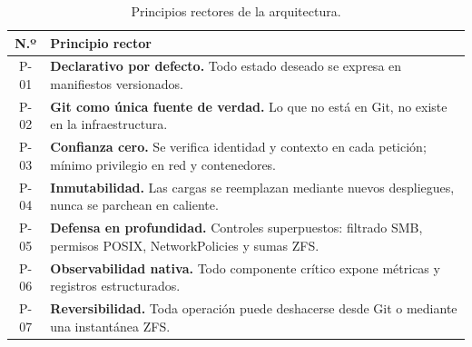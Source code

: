 \documentclass[10pt,a4paper]{article}
\begin{document}
\begin{table}[htbp]
\centering
\small
\caption{Principios rectores de la arquitectura.}
\label{tab:principios}
\begin{tabular}{|c|p{14.5cm}|}
\hline
\textbf{\textsf{N.º}} & \textbf{\textsf{Principio rector}} \\
\hline
P-01 & \textbf{Declarativo por defecto.} Todo estado deseado se expresa en manifiestos versionados. \\
\hline
P-02 & \textbf{Git como única fuente de verdad.} Lo que no está en Git, no existe en la infraestructura. \\
\hline
P-03 & \textbf{Confianza cero.} Se verifica identidad y contexto en cada petición; mínimo privilegio en red y contenedores. \\
\hline
P-04 & \textbf{Inmutabilidad.} Las cargas se reemplazan mediante nuevos despliegues, nunca se parchean en caliente. \\
\hline
P-05 & \textbf{Defensa en profundidad.} Controles superpuestos: filtrado SMB, permisos POSIX, NetworkPolicies y sumas ZFS. \\
\hline
P-06 & \textbf{Observabilidad nativa.} Todo componente crítico expone métricas y registros estructurados. \\
\hline
P-07 & \textbf{Reversibilidad.} Toda operación puede deshacerse desde Git o mediante una instantánea ZFS. \\
\hline
\end{tabular}
\end{table}
\end{document}
